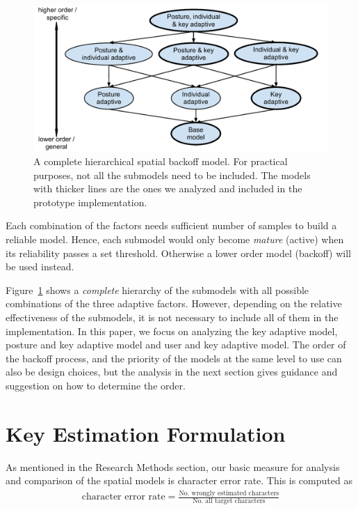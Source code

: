 \documentclass{sigchi}
\begin{document}
\begin{figure}[tb]
  \centering
  \includegraphics[width=0.9\columnwidth]{figures/hierarchy.pdf}
  \caption{A complete hierarchical spatial backoff model. For practical purposes, not all the submodels need to be included. The models with thicker lines are the ones we analyzed and included in the prototype implementation.}
  \label{fig:hierarchy}
\end{figure}

Each combination of the factors needs sufficient number of samples to build a reliable model. Hence, each submodel would only become \textit{mature} (active) when its reliability passes a set 
threshold. Otherwise a lower order model (backoff) will be used instead.

Figure~\ref{fig:hierarchy} shows a \textit{complete} hierarchy of the submodels with all
possible combinations of the three adaptive factors. However, depending on the
relative effectiveness of the submodels, it is not necessary to include all of
them in the implementation. In this paper, we focus on analyzing the key
adaptive model, posture and key adaptive model and user and key adaptive model.
The order of the
backoff process, and the priority of the models at the same level to use can
also be design choices, but the analysis in the next section gives
guidance and suggestion on how to determine the order.

\section{Key Estimation Formulation}\label{sec:formulation}
As mentioned in the Research Methods section, our basic measure for analysis and comparison of the spatial models is character error rate. This is computed as
\begin{align}
\text{character error rate} = \frac{\text{No. wrongly estimated characters}}{\text{No. all target characters}}
\end{align}
\end{document}

